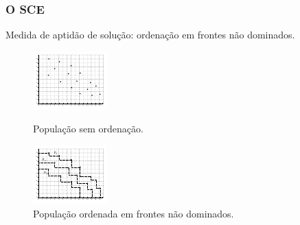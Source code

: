 \documentclass[10pt,xcolor=table,fleqn]{beamer}
\begin{document}
\begin{frame}
	\frametitle{O SCE}
  Medida de aptidão de solução: ordenação em frontes não dominados.
  \begin{figure}
    \centering
    \begin{minipage}[t]{0.48\textwidth}
      \includegraphics[width=\textwidth]{../img/sce/unrankpop}
      \caption{População sem ordenação.}
      \label{img:unrankpop}
    \end{minipage}
    \hfill
    \begin{minipage}[t]{0.48\textwidth}
      \includegraphics[width=\textwidth]{../img/sce/rankpop}
      \caption{População ordenada em frontes não dominados.}
      \label{img:rankpop}
    \end{minipage}
  \end{figure}
\end{frame}
\end{document}

